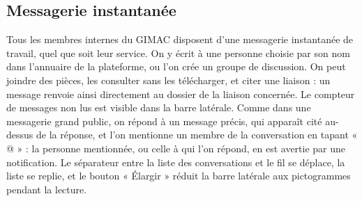 \documentclass[12pt,a4paper]{article}
\begin{document}
\subsection{Messagerie instantanée}
Tous les membres internes du GIMAC disposent d'une messagerie instantanée de travail, quel que soit leur service. On y écrit à une personne choisie par son nom dans l'annuaire de la plateforme, ou l'on crée un groupe de discussion. On peut joindre des pièces, les consulter sans les télécharger, et citer une liaison : un message renvoie ainsi directement au dossier de la liaison concernée. Le compteur de messages non lus est visible dans la barre latérale. Comme dans une messagerie grand public, on répond à un message précis, qui apparaît cité au-dessus de la réponse, et l'on mentionne un membre de la conversation en tapant « @ » : la personne mentionnée, ou celle à qui l'on répond, en est avertie par une notification. Le séparateur entre la liste des conversations et le fil se déplace, la liste se replie, et le bouton « Élargir » réduit la barre latérale aux pictogrammes pendant la lecture.
\end{document}
